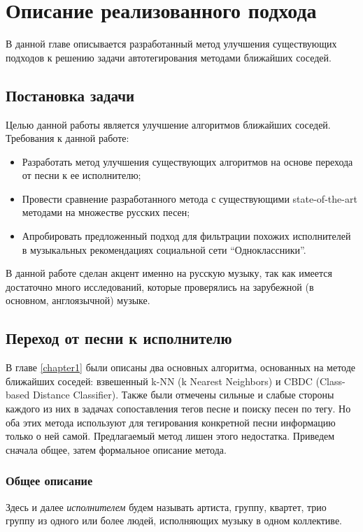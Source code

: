 \chapter{Описание реализованного подхода}
\label{chapter2}

В данной главе описывается разработанный метод улучшения существующих подходов к решению задачи автотегирования методами ближайших соседей.

\section{Постановка задачи}
Целью данной работы является улучшение алгоритмов ближайших соседей. Требования к данной работе:
\begin{itemize}
 \item Разработать метод улучшения существующих алгоритмов на основе перехода от песни к ее исполнителю;
 \item Провести сравнение разработанного метода с существующими state-of-the-art методами на множестве русских песен;
 \item Апробировать предложенный подход для фильтрации похожих исполнителей в музыкальных рекомендациях социальной сети ``Одноклассники''.
\end{itemize}

В данной работе сделан акцент именно на русскую музыку, так как имеется достаточно много исследований, которые проверялись на зарубежной (в основном, англоязычной) музыке.

\section{Переход от песни к исполнителю}

В главе \ref{chapter1} были описаны два основных алгоритма, основанных на методе ближайших соседей: взвешенный k-NN (k Nearest Neighbors) и CBDC (Class-based Distance Classifier).
Также были отмечены сильные и слабые стороны каждого из них в задачах сопоставления тегов песне и поиску песен по тегу. Но оба этих метода используют для тегирования конкретной песни
информацию только о ней самой. Предлагаемый метод лишен этого недостатка. Приведем сначала общее, затем формальное описание метода.

\subsection{Общее описание}

Здесь и далее \emph{исполнителем} будем называть артиста, группу, квартет, трио \ld группу из одного или более людей, исполняющих музыку в одном коллективе.

